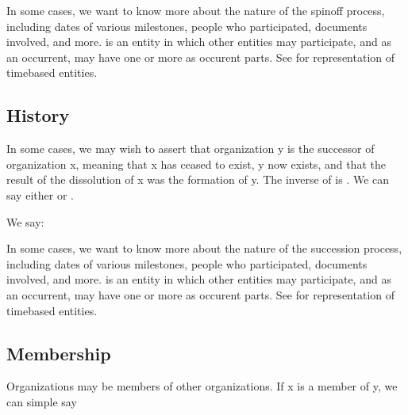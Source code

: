 \documentclass[letterpaper,10pt,english]{sphinxmanual}
\begin{document}
\sphinxAtStartPar
In some cases, we want to know more about the nature of the spin\sphinxhyphen{}off process, including
dates of various milestones, people who participated, documents involved, and more.
 is an entity in which other entities may participate, and as an
occurrent, may have one or more  as occurent parts. See
{\hyperref[\detokenize{datetimes::doc}]{}} for representation of time\sphinxhyphen{}based entities.


\subsection{History}
\label{\detokenize{associations:history}}
\sphinxAtStartPar
In some cases, we may wish to assert that organization y is the successor of organization
x, meaning that x has ceased to exist, y now exists, and that the result of the
dissolution
of x was the formation of y.  The inverse of  is .  We can
say
either  or  \sphinxfootnotemark[2].

\sphinxAtStartPar
We say:

\begin{sphinxVerbatim}[commandchars=\\\{\}]
  
  
  
\end{sphinxVerbatim}

\sphinxAtStartPar
In some cases, we want to know more about the nature of the succession process, including
dates of various milestones, people who participated, documents involved, and more.
 is an entity in which other entities may participate, and as an
occurrent, may have one or more  as occurent parts. See
{\hyperref[\detokenize{datetimes::doc}]{}} for representation of time\sphinxhyphen{}based entities.


\subsection{Membership}
\label{\detokenize{associations:membership}}
\sphinxAtStartPar
Organizations may be members of other organizations.  If x is a member of y, we can
simple say
\end{document}
